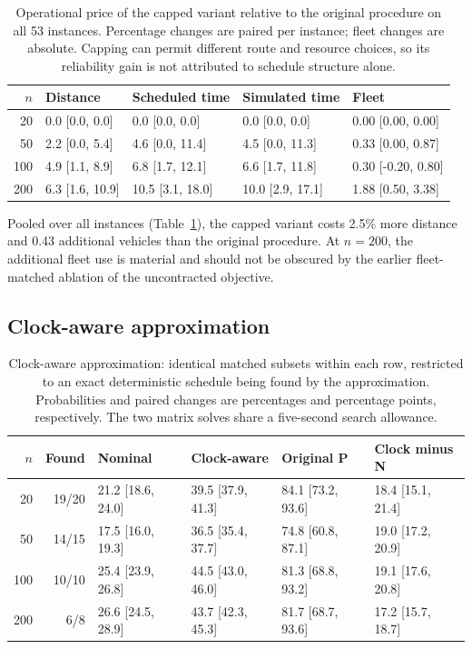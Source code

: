 \begin{table}[htbp]
\centering
\scriptsize
\caption{Operational price of the capped variant relative to the original procedure on all 53 instances. Percentage changes are paired per instance; fleet changes are absolute. Capping can permit different route and resource choices, so its reliability gain is not attributed to schedule structure alone.}
\label{tab:cap-cost}
\begin{tabular}{rllll}
\toprule
$n$ & Distance & Scheduled time & Simulated time & Fleet\\
\midrule
20 & 0.0 [0.0, 0.0] & 0.0 [0.0, 0.0] & 0.0 [0.0, 0.0] & 0.00 [0.00, 0.00]\\
50 & 2.2 [0.0, 5.4] & 4.6 [0.0, 11.4] & 4.5 [0.0, 11.3] & 0.33 [0.00, 0.87]\\
100 & 4.9 [1.1, 8.9] & 6.8 [1.7, 12.1] & 6.6 [1.7, 11.8] & 0.30 [-0.20, 0.80]\\
200 & 6.3 [1.6, 10.9] & 10.5 [3.1, 18.0] & 10.0 [2.9, 17.1] & 1.88 [0.50, 3.38]\\
\bottomrule
\end{tabular}
\end{table}


Pooled over all instances (Table~\ref{tab:cap-cost}), the capped variant costs 2.5\% more distance and 0.43 additional vehicles than the original procedure. At $n=200$, the additional fleet use is material and should not be obscured by the earlier fleet-matched ablation of the uncontracted objective.

\subsection{Clock-aware approximation}

\begin{table}[htbp]
\centering
\scriptsize
\caption{Clock-aware approximation: identical matched subsets within each row, restricted to an exact deterministic schedule being found by the approximation. Probabilities and paired changes are percentages and percentage points, respectively. The two matrix solves share a five-second search allowance.}
\label{tab:clock}
\begin{tabular}{rrllll}
\toprule
$n$ & Found & Nominal & Clock-aware & Original P & Clock minus N\\
\midrule
20 & 19/20 & 21.2 [18.6, 24.0] & 39.5 [37.9, 41.3] & 84.1 [73.2, 93.6] & 18.4 [15.1, 21.4]\\
50 & 14/15 & 17.5 [16.0, 19.3] & 36.5 [35.4, 37.7] & 74.8 [60.8, 87.1] & 19.0 [17.2, 20.9]\\
100 & 10/10 & 25.4 [23.9, 26.8] & 44.5 [43.0, 46.0] & 81.3 [68.8, 93.2] & 19.1 [17.6, 20.8]\\
200 & 6/8 & 26.6 [24.5, 28.9] & 43.7 [42.3, 45.3] & 81.7 [68.7, 93.6] & 17.2 [15.7, 18.7]\\
\bottomrule
\end{tabular}
\end{table}



